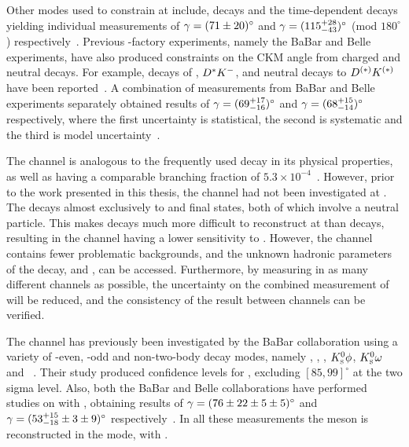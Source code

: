 Other modes used to constrain \Pgamma at \lhcb include, \decay{\Bz}{\D\Kstarz} decays and the time-dependent \decay{\Bs}{\Dspm\Kmp} decays yielding individual measurements of $\gamma = (71 \pm 20)^{\circ}$ and $\gamma = (115^{+28}_{-43})^{\circ}$ (mod $180^{\circ}$) respectively~\cite{LHCb-PAPER-2016-006,LHCb-PAPER-2014-038}. Previous \B-factory experiments, namely the BaBar and Belle experiments, have also produced constraints on the CKM angle \Pgamma from charged and neutral \B decays. For example, decays of \decay{\Bm}{\D\Km}, ${D}^*{{K}^-}$, \D\Kstarm and neutral \B decays to ${D}^{(*)}K^{(*)}$ have been reported~\cite{BabarGLW_latest,BabarADS_latest,BaBar-Gamma-2013,BaBarGGSZ,BaBar_B0,BelleGLW_latest,BelleADS_latest,BelleGGSZ}. A combination of measurements from BaBar and Belle experiments separately obtained results of $\gamma = (69^{+17}_{-16})^{\circ}$ and $\gamma = (68^{+15}_{-14})^{\circ}$ respectively, where the first uncertainty is statistical, the second is systematic and the third is model uncertainty~\cite{Babar_gamma,Belle_gamma}.

The \decay{\Bm}{\D\Kstarm} channel is analogous to the frequently used \decay{\Bm}{\D\Km} decay in its physical properties, as well as having a comparable branching fraction of $5.3 \times 10^{-4}$~\cite{PDG2016}. However, prior to the work presented in this thesis, the \decay{\Bm}{\D\Kstarm} channel had not been investigated at \lhcb. The \Kstarm decays almost exclusively to \Kz\pim and \Km\piz final states, both of which involve a neutral particle. This makes \decay{\Bm}{\D\Kstarm} decays much more difficult to reconstruct at \lhcb than \decay{\Bm}{\D\Km} decays, resulting in the \decay{\Bm}{\D\Kstarm} channel having a lower sensitivity to \Pgamma. However, the \decay{\Bm}{\D\Kstarm} channel contains fewer problematic backgrounds, and the unknown hadronic parameters of the \decay{\Bm}{\D\Kstarm} decay, \rb and \deltab, can be accessed. Furthermore, by measuring \Pgamma in as many different channels as possible, the uncertainty on the combined measurement of \Pgamma will be reduced, and the consistency of the result between channels can be verified. 

The \decay{\Bm}{\D\Kstarm} channel has previously been investigated by the BaBar collaboration using a variety of \CP-even, \CP-odd and non-\CP two-body \D decay modes, namely \Km\Kp, \pim\pip, \KS\piz, ${{K}^0_{\mathrm{ \scriptscriptstyle S}}}\phi$, ${{K}^0_{\mathrm{ \scriptscriptstyle S}}}\omega$ and \Km\pip~\cite{BaBarDKstar}. Their study produced confidence levels for \Pgamma, excluding $[85,99]^{\circ}$ at the two sigma level. Also, both the BaBar and Belle collaborations have performed studies on \decay{\Bm}{\D\Kstarm} with \decay{\D}{\KS\pip\pim}, obtaining results of $\gamma = (76 \pm 22 \pm 5 \pm 5)^{\circ}$ and $\gamma = (53^{+15}_{-18} \pm 3 \pm 9)^{\circ}$ respectively~\cite{BaBarGGSZ,BelleGGSZ}. In all these measurements the \Kstarm meson is reconstructed in the \KS\pim mode, with \decay{\KS}{\pip\pim}.

